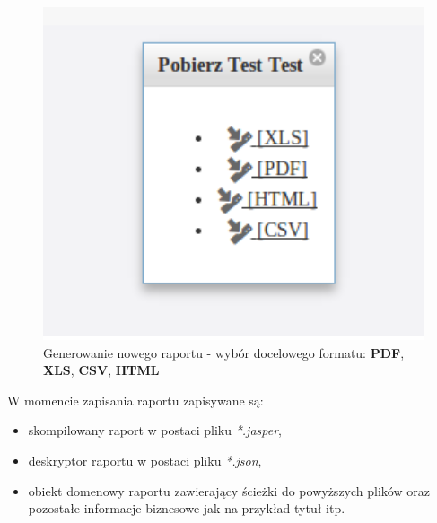 		\begin{figure}
			\centering
			\includegraphics[width=1.0\textwidth]{images/rbuilder_generateReport}
			\caption[Generowanie nowego raportu - wybór docelowego formatu]{
				Generowanie nowego raportu - wybór docelowego formatu: \textbf{PDF}, \textbf{XLS}, \textbf{CSV}, \textbf{HTML}
			}
			\vspace{-10pt}
			\label{app:wizard_newReport_generateReport}
		\end{figure}	
		
		W momencie zapisania raportu zapisywane są:
		\begin{itemize}
			\item skompilowany raport w postaci pliku \emph{*.jasper},
			\item deskryptor raportu w postaci pliku \emph{*.json},
			\item obiekt domenowy raportu zawierający ścieżki do powyższych plików oraz pozostałe informacje biznesowe jak na przykład tytuł itp. 
		\end{itemize}	
		
